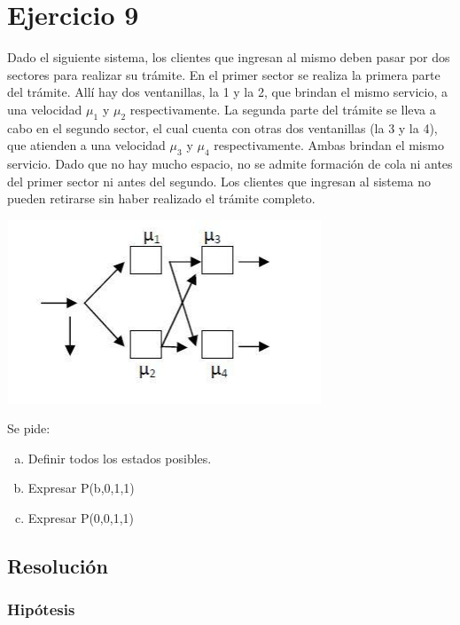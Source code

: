 \documentclass[a4paper,11pt]{article}
\begin{document}
\section{\textbf{Ejercicio 9}}

\vspace{13pt}
Dado el siguiente sistema, los clientes que ingresan al mismo deben pasar por
dos sectores para realizar su trámite. En el primer sector se realiza la
primera parte del trámite.  Allí hay dos ventanillas, la 1 y la 2, que brindan
el mismo servicio, a una velocidad $\mu_1$ y $\mu_2$ respectivamente. La segunda
parte del trámite se lleva a cabo en el segundo sector, el cual cuenta con
otras dos ventanillas (la 3 y la 4), que atienden a una velocidad $\mu_3$ y
$\mu_4$ respectivamente.  Ambas brindan el mismo servicio. Dado que no hay mucho
espacio, no se admite formación de cola ni antes del primer sector ni antes del
segundo. Los clientes que ingresan al sistema no pueden retirarse sin haber
realizado el trámite completo.

\vspace{13pt}
\includegraphics[width=266pt, height=155pt, keepaspectratio=true]{TP1-Colas-fig008.png}

\vspace{13pt}
Se pide:
\begin{enumerate}[a)]
  \item Definir todos los estados posibles.
  \item Expresar P(b,0,1,1)
  \item Expresar P(0,0,1,1)  
\end{enumerate}

\vspace{13pt}
\leftskip=0pt
\parindent=0pt
\subsection{\textbf{Resolución}}

\vspace{21pt}
\subsubsection*{Hipótesis}
\end{document}
